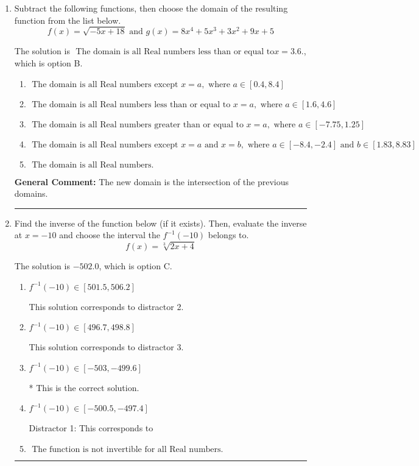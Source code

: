 \documentclass{extbook}[14pt]
\newcommand{\litem}[1]{\item #1

\rule{\textwidth}{0.4pt}}
\begin{document}
\begin{enumerate}\litem{
Subtract the following functions, then choose the domain of the resulting function from the list below.
\[ f(x) = \sqrt{-5x+18}  \text{ and } g(x) = 8x^{4} +5 x^{3} +3 x^{2} +9 x + 5 \]

The solution is \( \text{ The domain is all Real numbers less than or equal to} x = 3.6. \), which is option B.\begin{enumerate}[label=\Alph*.]
\item \( \text{ The domain is all Real numbers except } x = a, \text{ where } a \in [0.4, 8.4] \)


\item \( \text{ The domain is all Real numbers less than or equal to } x = a, \text{ where } a \in [1.6, 4.6] \)


\item \( \text{ The domain is all Real numbers greater than or equal to } x = a, \text{ where } a \in [-7.75, 1.25] \)


\item \( \text{ The domain is all Real numbers except } x = a \text{ and } x = b, \text{ where } a \in [-8.4, -2.4] \text{ and } b \in [1.83, 8.83] \)


\item \( \text{ The domain is all Real numbers. } \)


\end{enumerate}

\textbf{General Comment:} The new domain is the intersection of the previous domains.
}
\litem{
Find the inverse of the function below (if it exists). Then, evaluate the inverse at $x = -10$ and choose the interval the $f^{-1}(-10)$ belongs to.
\[ f(x) = \sqrt[3]{2 x + 4} \]

The solution is \( -502.0 \), which is option C.\begin{enumerate}[label=\Alph*.]
\item \( f^{-1}(-10) \in [501.5, 506.2] \)

 This solution corresponds to distractor 2.
\item \( f^{-1}(-10) \in [496.7, 498.8] \)

 This solution corresponds to distractor 3.
\item \( f^{-1}(-10) \in [-503, -499.6] \)

* This is the correct solution.
\item \( f^{-1}(-10) \in [-500.5, -497.4] \)

 Distractor 1: This corresponds to 
\item \( \text{ The function is not invertible for all Real numbers. } \)


\end{enumerate}}
\end{enumerate}
\end{document}
